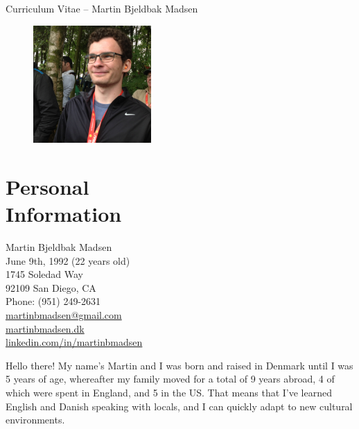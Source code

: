 \documentclass[margin,line]{resume}
\begin{document}
\raggedright
{\sc \Large Curriculum Vitae -- Martin Bjeldbak Madsen}
\begin{resume}
    \vspace{0.5cm}
    \begin{figure}
         \vspace{-1cm}
        \begin{center}
        \includegraphics[width=0.4\textwidth]{moi.jpg}
        \end{center}
         \vspace{-3.5cm}
    \end{figure}

    \section{\mysidestyle Personal\\Information}%
    Martin Bjeldbak Madsen\\
    June 9th, 1992 (22 years old)\\ 
    1745 Soledad Way \\
    92109 San Diego, CA \\
    Phone: (951) 249-2631\\
    \href{mailto:martinbmadsen@gmail.com}{martinbmadsen@gmail.com}\\
    \href{http://martinbmadsen.dk}{martinbmadsen.dk}\\
    \href{http://dk.linkedin.com/in/martinbmadsen/}{linkedin.com/in/martinbmadsen}
    \vspace{1.25cm}

    Hello there! My name's Martin and I was born and raised in Denmark
    until I was 5 years of age, whereafter my family moved for a total
    of 9 years abroad, 4 of which were spent in England, and 5 in the
    US. That means that I've learned English and Danish speaking with
    locals, and I can quickly adapt to new cultural environments.


\end{resume}
\end{document}
